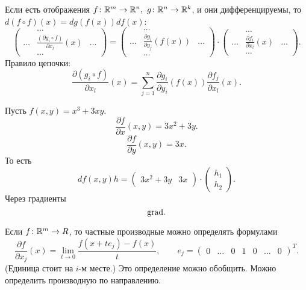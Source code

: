 \begin{st}
    Если есть отображения $ f\colon  \mathbb{R}^{m} \to  \mathbb{R}^{n} , ~ g \colon \mathbb{R}^{n} \to \mathbb{R}^{k} $, и они дифференцируемы, то $ d(f \circ f) (x) = dg(f(x))df(x)$:
     \[
    \begin{pmatrix}
	&\dots & \\
	\dots & \frac{ (\partial g_i \circ f)}{ \partial x_l}(x) & \dots \\
	      &\dots&
    \end{pmatrix} = 
    \begin{pmatrix}
	&\dots & \\
	\dots &  \frac{\partial g_i}{ \partial y_j}(f(x)) & \dots \\
	      &\dots&
    \end{pmatrix}
    \cdot
    \begin{pmatrix}
	&\dots & \\
	\dots &  \frac{\partial f_i}{ \partial x_l}(x) & \dots \\
	      &\dots&
    \end{pmatrix}
    .\] 
    Правило цепочки:
    \[
	\frac{ \partial (g_i \circ f)}{ \partial x_l}(x) = \sum_{j=1}^{n} \frac{ \partial g_i}{ \partial y_i} (f(x)) \frac{ \partial f_j}{ \partial x_l}(x)
    .\] 
\end{st}
\begin{st}
    
\end{st}
\begin{ex}
    Пусть $ f(x, y) = x^3+ 3xy$. 
    \[
	\frac{ \partial f}{ \partial x}(x, y) = 3x^2+ 3y
    .\] 
    \[
	\frac{ \partial f}{ \partial y} (x, y) = 3x
    .\] 
    То есть
    \[
	df(x, y)h = 
    \begin{pmatrix}
	3x^2+3y & 3x
    \end{pmatrix}
    \cdot 
    \begin{pmatrix}
        h_1 \\ h_2
    \end{pmatrix}
    .\] 
    Через градиенты
    \[
    {\mathop{\text{\rm grad}}}
    .\] 
\end{ex}
\begin{st}
    Если $ f \colon \mathbb{R}^{m}  \to  R$, то частные производные можно определять формулами
    \[
	\frac{ \partial f}{ \partial x_j} (x) = \lim_{t \to  0} \frac{ f(x+te_j) - f(x)}{t}, \qquad  e_j = 
	\begin{pmatrix}
	    0& \ldots &0 & 1 &0& \ldots &0
	\end{pmatrix}^T
    .\] (Единица стоит на $ i$-м месте.) 
    Это определение можно обобщить. Можно определить производную по направлению.
\end{st}
